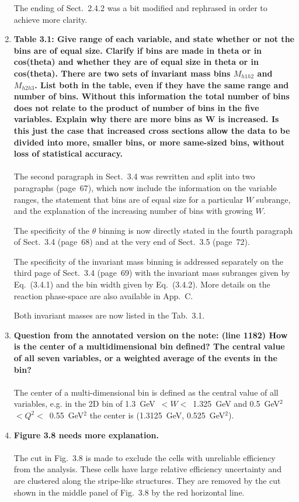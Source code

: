 \documentclass[,superscriptaddress,showpacs,amssymb,amsmath,amsfonts,linenumbers,article]{revtex4-1}
\begin{document}
\begin{enumerate}[label=\textbf{\arabic*}.]
The ending of Sect.~2.4.2 was a bit modified and rephrased in order to achieve more clarity.


\item{\bf  Table 3.1: Give range of each variable, and state whether or not the bins are of equal size. Clarify if bins are made in theta or in cos(theta) and whether they are of equal size in theta or in cos(theta). There are two sets of invariant mass bins $M_{h1h2}$ and $M_{h2h3}$. List both in the table, even if they have the same range and number of bins. Without this information the total number of bins does not relate to the product of number of bins in the five variables. Explain why there are more bins as W is increased. Is this just the case that increased cross sections allow the data to be divided into more, smaller bins, or more same-sized bins, without loss of statistical accuracy.}\\ \\
The second paragraph in Sect.~3.4 was rewritten and split into two paragraphs (page~67), which now include the information on the variable ranges, the statement that bins are of equal size for a particular $W$ subrange, and the explanation of the increasing number of bins with growing $W$. 

The specificity of the $\theta$ binning is now directly stated in the fourth paragraph of Sect.~3.4 (page~68) and at the very end of Sect.~3.5 (page~72).

The specificity of the invariant mass binning is addressed separately on the third page of Sect.~3.4 (page~69) with the invariant mass subranges given by Eq.~(3.4.1) and the bin width given by Eq.~(3.4.2). More details on the reaction phase-space are also available in App.~C. 

Both invariant masses are now listed in the Tab.~3.1.

\item {\bf Question from the annotated version on the note: (line 1182) How is the center of a multidimensional bin defined? The central value of all seven variables, or a weighted average of the events in the bin?}\\ \\
The center of a multi-dimensional bin is defined as the central value of all variables, e.g. in the 2D bin of 1.3~GeV~$<W<$~1.325~GeV and 0.5~GeV$^{2}$$<Q^{2}<$~0.55~GeV$^2$ the center is (1.3125~GeV, 0.525~GeV$^2$).



\item {\bf Figure 3.8 needs more explanation.}\\ \\
The cut in Fig.~3.8 is made to exclude the cells with unreliable efficiency from the analysis. These cells have large relative efficiency uncertainty and are clustered along the stripe-like structures. They are removed by the cut shown in the middle panel of Fig.~3.8 by the red horizontal line.


\end{enumerate}
\end{document}
